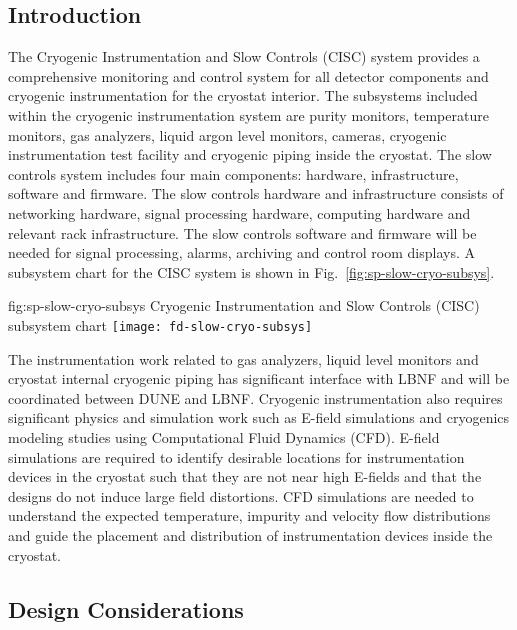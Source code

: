 \subsection{Introduction}
\label{sec:fdsp-slow-cryo-intro}

The Cryogenic Instrumentation and Slow Controls (CISC) system provides a comprehensive monitoring and control system for all detector components and cryogenic instrumentation for the cryostat interior. The subsystems included within the cryogenic instrumentation system are purity monitors, temperature monitors, gas analyzers, liquid argon level monitors, cameras, cryogenic instrumentation test facility and cryogenic piping inside the cryostat. The slow controls system includes four main components: hardware, infrastructure, software and firmware. The slow controls hardware and infrastructure consists of networking hardware, signal processing hardware, computing hardware and relevant rack infrastructure. The slow controls software and firmware will be needed for signal processing, alarms, archiving and control room displays. A subsystem chart for the CISC system is shown in Fig.\ \ref{fig:sp-slow-cryo-subsys}.

\begin{dunefigure}{fig:sp-slow-cryo-subsys}
{Cryogenic Instrumentation and Slow Controls (CISC) subsystem chart}
\texttt{[image: fd-slow-cryo-subsys]}
\end{dunefigure}

The instrumentation work related to gas analyzers, liquid level
monitors and cryostat internal cryogenic piping has significant
interface with LBNF and will be coordinated between DUNE and LBNF.
Cryogenic instrumentation also requires significant physics and
simulation work such as E-field simulations and cryogenics modeling
studies using Computational Fluid Dynamics (CFD). E-field simulations
are required to identify desirable locations for instrumentation
devices in the cryostat such that they are not near high E-fields and
that the designs do not induce large field distortions. CFD
simulations are needed to understand the expected temperature,
impurity and velocity flow distributions and guide the placement and
distribution of instrumentation devices inside the cryostat.


\subsection{Design Considerations}
\label{sec:fdsp-slow-cryo-des-consid}

